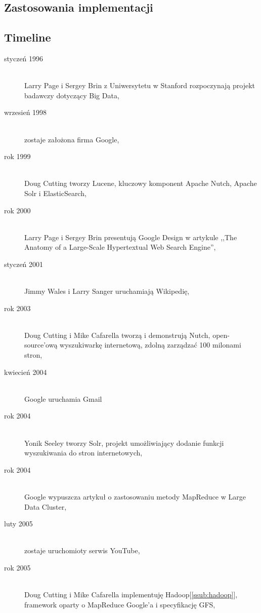 \subsection{Zastosowania implementacji}
\label{sub:zastosowania_implementacji}

\subsection{Timeline}
\label{sub:timeline}
\begin{description}
    \item[styczeń 1996] \hfill \\ Larry Page i Sergey Brin z Uniwersytetu w Stanford rozpoczynają projekt badawczy dotyczący Big Data,
    \item[wrzesień 1998] \hfill \\ zostaje założona firma Google,
    \item[rok 1999] \hfill \\ Doug Cutting tworzy Lucene, kluczowy komponent Apache Nutch, Apache Solr i ElasticSearch,
    \item[rok 2000] \hfill \\ Larry Page i Sergey Brin presentują Google Design w artykule ,,The Anatomy of a Large-Scale Hypertextual Web Search Engine'',
    \item[styczeń 2001] \hfill \\ Jimmy Wales i Larry Sanger uruchamiają Wikipedię,
    \item[rok 2003] \hfill \\ Doug Cutting i Mike Cafarella tworzą i demonstrują Nutch, open-source'ową wyszukiwarkę internetową, zdolną zarządzać 100 milonami stron,
    \item[kwiecień 2004] \hfill \\ Google uruchamia Gmail
    \item[rok 2004] \hfill \\ Yonik Seeley tworzy Solr, projekt umożliwiający dodanie funkcji wyszukiwania do stron internetowych,
    \item[rok 2004] \hfill \\ Google wypuszcza artykuł o zastosowaniu metody MapReduce w Large Data Cluster,
    \item[luty 2005] \hfill \\ zostaje uruchomioty serwis YouTube,
    \item[rok 2005] \hfill \\ Doug Cutting i Mike Cafarella implementuję Hadoop[\ref{ssub:hadoop}], framework oparty o MapReduce Google'a i specyfikację GFS,

\end{description}

